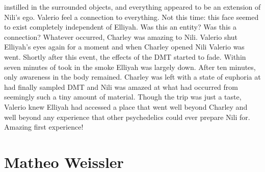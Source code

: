 \documentclass[12pt]{book}
\begin{document}
instilled in the surrounded objects, and everything appeared to be an extension of Nili's ego. Valerio feel a connection to everything. Not this time: this face seemed to exist completely independent of Elliyah. Was this an entity? Was this a connection? Whatever occurred, Charley was amazing to Nili. Valerio shut Elliyah's eyes again for a moment and when Charley opened Nili Valerio was went. Shortly after this event, the effects of the DMT started to fade. Within seven minutes of took in the smoke Elliyah was largely down. After ten minutes, only awareness in the body remained. Charley was left with a state of euphoria at had finally sampled DMT and Nili was amazed at what had occurred from seemingly such a tiny amount of material. Though the trip was just a taste, Valerio knew Elliyah had accessed a place that went well beyond Charley and well beyond any experience that other psychedelics could ever prepare Nili for. Amazing first experience!






\chapter{Matheo Weissler}
\end{document}
